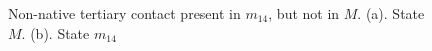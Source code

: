 \documentclass[journal=jacsat,manuscript=article]{achemso}
\begin{document}
\newpage

\begin{figure}

\caption{
Non-native tertiary contact present in $m_{14}$, but not in $M$.  (a).  State $M$.  (b).  State $m_{14}$
}
\label{figure:PDB_contact}
\end{figure}

\clearpage


\end{document}
